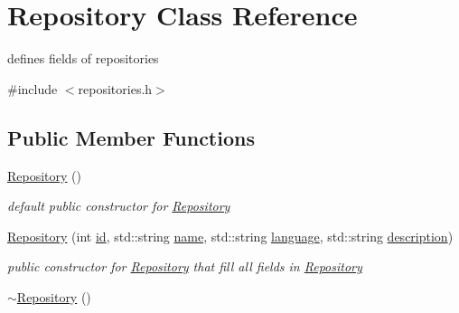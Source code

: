 \hypertarget{classRepository}{}\section{Repository Class Reference}
\label{classRepository}


defines fields of repositories  




{\ttfamily \#include $<$repositories.\+h$>$}

\subsection*{Public Member Functions}
\begin{DoxyCompactItemize}
\item 
\hyperlink{classRepository_acea749ed86f3239ecf20c696f721ab7e}{Repository} ()\hypertarget{classRepository_acea749ed86f3239ecf20c696f721ab7e}{}\label{classRepository_acea749ed86f3239ecf20c696f721ab7e}

\begin{DoxyCompactList}\small\item\em default public constructor for \hyperlink{classRepository}{Repository} \end{DoxyCompactList}\item 
\hyperlink{classRepository_ae706286558286f91aecf1274c0e730ea}{Repository} (int \hyperlink{classRepository_a939747771b843e2e6ac651bdf273ec0f}{id}, std\+::string \hyperlink{classRepository_a8d967c3615e5a68be145889fb23aac14}{name}, std\+::string \hyperlink{classRepository_adffe93ad41af4c08c3adb8bcb1ea12fa}{language}, std\+::string \hyperlink{classRepository_a81933778a20e63810589ebc9de593782}{description})
\begin{DoxyCompactList}\small\item\em public constructor for \hyperlink{classRepository}{Repository} that fill all fields in \hyperlink{classRepository}{Repository} \end{DoxyCompactList}\item 
\hyperlink{classRepository_a26ba073b495c4b231658713f1e3ffeae}{$\sim$\+Repository} ()\hypertarget{classRepository_a26ba073b495c4b231658713f1e3ffeae}{}\label{classRepository_a26ba073b495c4b231658713f1e3ffeae}


\end{DoxyCompactItemize}
